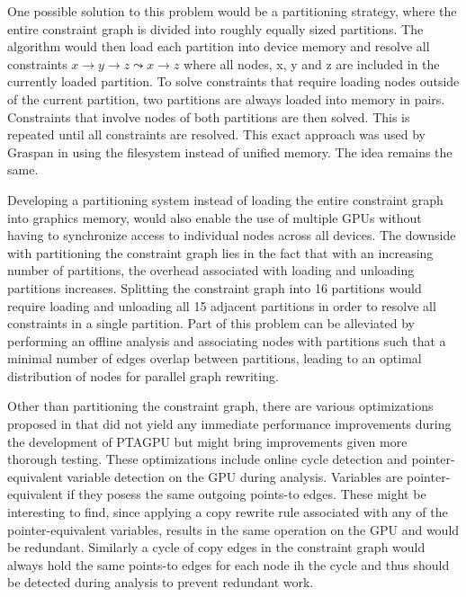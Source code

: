 One possible solution to this problem would be a partitioning strategy, where the entire constraint graph is divided into roughly equally sized partitions.
The algorithm would then load each partition into device memory and resolve all constraints  $x \rightarrow y \rightarrow z \mathrel{\leadsto} x \rightarrow z$ where all nodes, x, y and z are included in the currently loaded partition.
To solve constraints that require loading nodes outside of the current partition, two partitions are always loaded into memory in pairs. Constraints that involve nodes of both partitions are then solved. This is repeated until all constraints are resolved.
This exact approach was used by Graspan in \cite{zuo2021systemizing} using the filesystem instead of unified memory. The idea remains the same.

Developing a partitioning system instead of loading the entire constraint graph into graphics memory, would also enable the use of multiple GPUs without having to synchronize access to individual nodes across all devices. 
The downside with partitioning the constraint graph lies in the fact that with an increasing number of partitions, the overhead associated with loading and unloading partitions increases.
Splitting the constraint graph into 16 partitions would require loading and unloading all 15 adjacent partitions in order to resolve all constraints in a single partition.
Part of this problem can be alleviated by performing an offline analysis and associating nodes with partitions such that a minimal number of edges overlap between partitions, leading to an optimal distribution of nodes for parallel graph rewriting.

Other than partitioning the constraint graph, there are various optimizations proposed in \cite{mendez2012gpu} that did not yield any immediate performance improvements during the development of PTAGPU but might bring improvements given more thorough testing.
These optimizations include online cycle detection and pointer-equivalent variable detection on the GPU during analysis.
Variables are pointer-equivalent if they posess the same outgoing points-to edges. These might be interesting to find, since applying a copy rewrite rule associated with any of the pointer-equivalent variables, results in the same operation on the GPU and would be redundant.
Similarly a cycle of copy edges in the constraint graph would always hold the same points-to edges for each node ih the cycle and thus should be detected during analysis to prevent redundant work.

